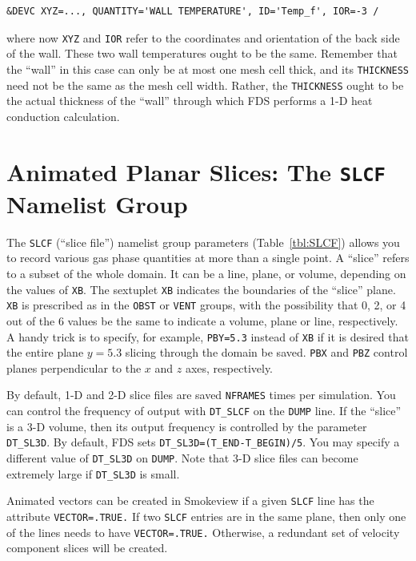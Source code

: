 \documentclass[11pt]{book}
\newcommand{\ct}{\tt\small}
\begin{document}
\footnotesize
\begin{verbatim}
&DEVC XYZ=..., QUANTITY='WALL TEMPERATURE', ID='Temp_f', IOR=-3 /
\end{verbatim} \normalsize

\noindent
where now {\ct XYZ} and {\ct IOR} refer to the coordinates and orientation of the back side of the wall. These two wall temperatures ought to be
the same. Remember that the ``wall'' in this case can only be at most one mesh cell thick, and its {\ct THICKNESS} need not be the same as the
mesh cell width. Rather, the {\ct THICKNESS} ought to be the actual thickness of the ``wall'' through which FDS performs a 1-D heat conduction
calculation.




\section{Animated Planar Slices: The \texorpdfstring{{\tt SLCF}}{SLCF} Namelist Group}
\label{info:SLCF}

The {\ct SLCF} (``slice file'') namelist group parameters (Table~\ref{tbl:SLCF})
allows you to record various gas phase quantities
at more than a single point. A ``slice'' refers to a subset of the whole domain. It can be a line,
plane, or volume, depending on the values of {\ct XB}.
The sextuplet {\ct XB} indicates the boundaries of the ``slice'' plane.
{\ct XB} is prescribed as in the {\ct OBST} or {\ct VENT} groups, with
the possibility that 0, 2, or 4 out of the 6 values be the same to
indicate a volume, plane or line, respectively. A handy trick is to
specify, for example, {\ct PBY=5.3} instead of {\ct XB} if it is desired
that the entire plane $y=5.3$ slicing through the domain be saved.
{\ct PBX} and {\ct PBZ} control planes perpendicular to the
$x$ and $z$ axes, respectively.

By default, 1-D and 2-D slice files are saved {\ct NFRAMES} times per simulation. You can control the frequency of output with {\ct DT\_SLCF} on the {\ct DUMP} line.
If the ``slice'' is a 3-D volume, then its output frequency is controlled by the parameter {\ct DT\_SL3D}.  By default, FDS sets {\ct DT\_SL3D=(T\_END-T\_BEGIN)/5}.  You may specify a different value of {\ct DT\_SL3D} on {\ct DUMP}.  Note that 3-D slice files can become extremely large if {\ct DT\_SL3D} is small.

Animated vectors can be created in Smokeview if a given {\ct SLCF} line has the attribute {\ct VECTOR=.TRUE.} If two {\ct SLCF}
entries are in the same plane, then only one of the lines needs to have {\ct VECTOR=.TRUE.} Otherwise, a redundant set of velocity
component slices will be created.
\end{document}
